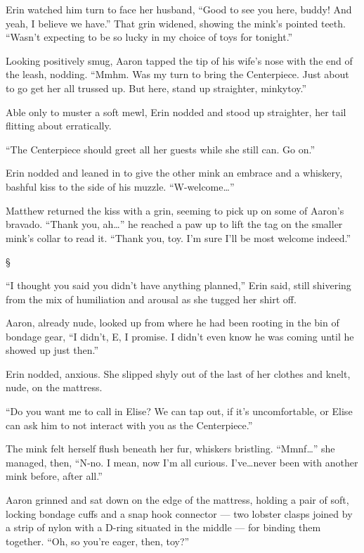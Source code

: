 \documentclass[12pt,letterpaper,oneside]{memoir}
\newcommand\secdiv{
  \begin{center}
    \S
  \end{center}
}
\begin{document}
  Erin watched him turn to face her husband, ``Good to see you here, buddy! And yeah, I believe we have.'' That grin widened, showing the mink's pointed teeth. ``Wasn't expecting to be so lucky in my choice of toys for tonight.''

  Looking positively smug, Aaron tapped the tip of his wife's nose with the end of the leash, nodding. ``Mmhm. Was my turn to bring the Centerpiece. Just about to go get her all trussed up. But here, stand up straighter, minkytoy.''

  Able only to muster a soft mewl, Erin nodded and stood up straighter, her tail flitting about erratically.

  ``The Centerpiece should greet all her guests while she still can. Go on.''

  Erin nodded and leaned in to give the other mink an embrace and a whiskery, bashful kiss to the side of his muzzle. ``W-welcome\ldots{}''

  Matthew returned the kiss with a grin, seeming to pick up on some of Aaron's bravado. ``Thank you, ah\ldots{}'' he reached a paw up to lift the tag on the smaller mink's collar to read it. ``Thank you, toy. I'm sure I'll be most welcome indeed.''

  \secdiv

  ``I thought you said you didn't have anything planned,'' Erin said, still shivering from the mix of humiliation and arousal as she tugged her shirt off.

  Aaron, already nude, looked up from where he had been rooting in the bin of bondage gear, ``I didn't, E, I promise. I didn't even know he was coming until he showed up just then.''

  Erin nodded, anxious. She slipped shyly out of the last of her clothes and knelt, nude, on the mattress.

  ``Do you want me to call in Elise? We can tap out, if it's uncomfortable, or Elise can ask him to not interact with you as the Centerpiece.''

  The mink felt herself flush beneath her fur, whiskers bristling. ``Mmnf\ldots{}'' she managed, then, ``N-no. I mean, now I'm all curious. I've\ldots{}never been with another mink before, after all.''

  Aaron grinned and sat down on the edge of the mattress, holding a pair of soft, locking bondage cuffs and a snap hook connector --- two lobster clasps joined by a strip of nylon with a D-ring situated in the middle --- for binding them together. ``Oh, so you're eager, then, toy?''
\end{document}
